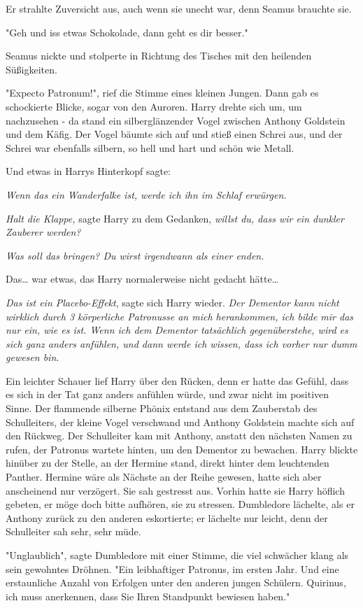 {Er strahlte Zuversicht aus, auch wenn sie unecht war, denn Seamus brauchte sie.

"Geh und iss etwas Schokolade, dann geht es dir besser."

Seamus nickte und stolperte in Richtung des Tisches mit den heilenden Süßigkeiten.

"Expecto Patronum!", rief die Stimme eines kleinen Jungen. Dann gab es schockierte Blicke, sogar von den Auroren. Harry drehte sich um, um nachzusehen - da stand ein silberglänzender Vogel zwischen Anthony Goldstein und dem Käfig. Der Vogel bäumte sich auf und stieß einen Schrei aus, und der Schrei war ebenfalls silbern, so hell und hart und schön wie Metall.

Und etwas in Harrys Hinterkopf sagte:

\emph{Wenn das ein Wanderfalke ist, werde ich ihn im Schlaf erwürgen.}

\emph{Halt die Klappe,} sagte Harry zu dem Gedanken, \emph{willst du, dass wir ein dunkler Zauberer werden?}

\emph{Was soll das bringen? Du wirst irgendwann als einer enden.}

Das… war etwas, das Harry normalerweise nicht gedacht hätte…

\emph{Das ist ein Placebo-Effekt}, sagte sich Harry wieder. \emph{Der Dementor kann nicht wirklich durch 3 körperliche Patronusse an mich herankommen, ich bilde mir das nur ein, wie es ist. Wenn ich dem Dementor tatsächlich gegenüberstehe, wird es sich ganz anders anfühlen, und dann werde ich wissen, dass ich vorher nur dumm gewesen bin}.

Ein leichter Schauer lief Harry über den Rücken, denn er hatte das Gefühl, dass es sich in der Tat ganz anders anfühlen würde, und zwar nicht im positiven Sinne. Der flammende silberne Phönix entstand aus dem Zauberstab des Schulleiters, der kleine Vogel verschwand und Anthony Goldstein machte sich auf den Rückweg. Der Schulleiter kam mit Anthony, anstatt den nächsten Namen zu rufen, der Patronus wartete hinten, um den Dementor zu bewachen. Harry blickte hinüber zu der Stelle, an der Hermine stand, direkt hinter dem leuchtenden Panther. Hermine wäre als Nächste an der Reihe gewesen, hatte sich aber anscheinend nur verzögert. Sie sah gestresst aus. Vorhin hatte sie Harry höflich gebeten, er möge doch bitte aufhören, sie zu stressen. Dumbledore lächelte, als er Anthony zurück zu den anderen eskortierte; er lächelte nur leicht, denn der Schulleiter sah sehr, sehr müde.

"Unglaublich", sagte Dumbledore mit einer Stimme, die viel schwächer klang als sein gewohntes Dröhnen. "Ein leibhaftiger Patronus, im ersten Jahr. Und eine erstaunliche Anzahl von Erfolgen unter den anderen jungen Schülern. Quirinus, ich muss anerkennen, dass Sie Ihren Standpunkt bewiesen haben."

}
